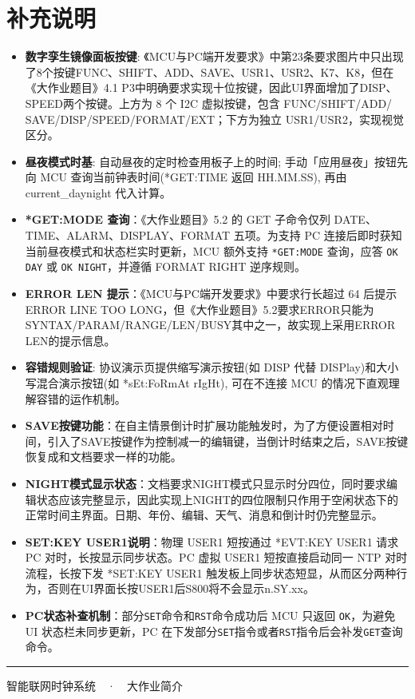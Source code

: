 \documentclass[11pt,a4paper]{article}
\begin{document}
\section{补充说明}
\begin{itemize}
  \item \textbf{数字孪生镜像面板按键}: 《MCU与PC端开发要求》中第23条要求图片中只出现了8个按键FUNC、SHIFT、ADD、SAVE、USR1、USR2、K7、K8，但在《大作业题目》4.1 P3中明确要求实现十位按键，因此UI界面增加了DISP、SPEED两个按键。上方为 8 个 I2C 虚拟按键，包含 FUNC/SHIFT/ADD/
     SAVE/DISP/SPEED/FORMAT/EXT；下方为独立 USR1/USR2，实现视觉区分。
  \item \textbf{昼夜模式时基}: 自动昼夜的定时检查用板子上的时间; 手动「应用昼夜」按钮先向 MCU 查询当前钟表时间(*GET:TIME 返回 HH.MM.SS), 再由 current\_daynight 代入计算。
  \item \textbf{*GET:MODE 查询}：《大作业题目》5.2 的 GET 子命令仅列 DATE、TIME、ALARM、DISPLAY、FORMAT 五项。为支持 PC 连接后即时获知当前昼夜模式和状态栏实时更新，MCU 额外支持 \texttt{*GET:MODE} 查询，应答 \texttt{OK DAY} 或 \texttt{OK NIGHT}，并遵循 FORMAT RIGHT 逆序规则。
  \item \textbf{ERROR LEN 提示}：《MCU与PC端开发要求》中要求行长超过 64 后提示 ERROR LINE TOO LONG，但《大作业题目》5.2要求ERROR只能为SYNTAX/PARAM/RANGE/LEN/BUSY其中之一，故实现上采用ERROR LEN的提示信息。
  \item \textbf{容错规则验证}: 协议演示页提供缩写演示按钮(如 DISP 代替 DISPlay)和大小写混合演示按钮(如 *sEt:FoRmAt rIgHt), 可在不连接 MCU 的情况下直观理解容错的运作机制。
  \item \textbf{SAVE按键功能}：在自主情景倒计时扩展功能触发时，为了方便设置相对时间，引入了SAVE按键作为控制减一的编辑键，当倒计时结束之后，SAVE按键恢复成和文档要求一样的功能。
  \item \textbf{NIGHT模式显示状态}：文档要求NIGHT模式只显示时分四位，同时要求编辑状态应该完整显示，因此实现上NIGHT的四位限制只作用于空闲状态下的正常时间主界面。日期、年份、编辑、天气、消息和倒计时仍完整显示。
  \item \textbf{SET:KEY USER1说明}：物理 USER1 短按通过 *EVT:KEY USER1 请求 PC 对时，长按显示同步状态。PC 虚拟 USER1 短按直接启动同一 NTP 对时流程，长按下发 *SET:KEY USER1 触发板上同步状态短显，从而区分两种行为，否则在UI界面长按USER1后S800将不会显示n.SY.xx。
  \item \textbf{PC状态补查机制}：部分\texttt{SET}命令和\texttt{RST}命令成功后 MCU 只返回 \texttt{OK}，为避免 UI 状态栏未同步更新，PC 在下发部分\texttt{SET}指令或者\texttt{RST}指令后会补发\texttt{GET}查询命令。
\end{itemize}

\vfill
\begin{center}
\rule{8cm}{0.5pt}

{\small 智能联网时钟系统~~·~~大作业简介}\\[2pt]
\end{center}
\end{document}
